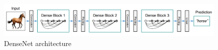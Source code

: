 \begin{figure}[H]
	\centering
	\includegraphics[width=\linewidth]{figures/densenet}
	\caption{\textmd{DenseNet architecture}}
	\label{fig:densenet-model}
\end{figure}
